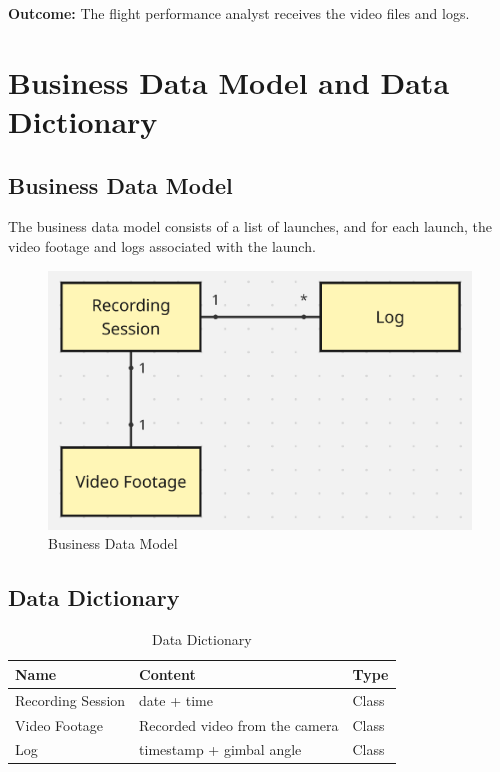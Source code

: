 \documentclass[12pt]{article}
\begin{document}
\textbf{Outcome:} The flight performance analyst receives the video files and logs.

\section{Business Data Model and Data Dictionary}
\subsection{Business Data Model}

The business data model consists of a list of launches, and for each launch,
the video footage and logs associated with the launch.

\FloatBarrier
\begin{figure}[h]
  \centering
  \includegraphics[width=\textwidth,height=\textheight,keepaspectratio]{../Images/business_data_model.png}
  \caption{Business Data Model}
  \label{img:business-data-model}
\end{figure}
\FloatBarrier

\subsection{Data Dictionary}

\begin{table}[H]
  \centering
  \setlength\extrarowheight{5mm}
  \begin{tabularx}{\textwidth}{lXp{1in}}
    \toprule \textbf{Name} & \textbf{Content}               &
    \textbf{Type}                                             \\
    \midrule
    Recording Session      & date + time                    &
    Class
    \\
    Video Footage          & Recorded video from the camera &
    Class
    \\
    Log                    & timestamp + gimbal angle       &
    Class
    \\
    \bottomrule
  \end{tabularx}
  \caption{Data Dictionary}
  \label{tab:data-dictionary}
\end{table}
\end{document}
